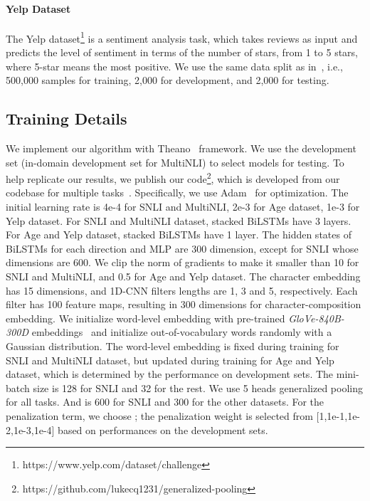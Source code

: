\documentclass[11pt]{article}
\begin{document}
\paragraph{Yelp Dataset} The Yelp dataset\footnote{https://www.yelp.com/dataset/challenge} is a sentiment analysis task, which takes reviews as input and predicts the level of sentiment in terms of the number of stars, from 1 to 5 stars, where 5-star means the most positive. We use the same data split as in~, i.e., 500,000 samples for training, 2,000 for development, and 2,000 for testing.

\subsection{Training Details} 
We implement our algorithm with Theano~\cite{2016arXiv160502688short} framework.
We use the development set (in-domain development set for MultiNLI) to select models for testing. To help replicate our results, we publish our code\footnote{https://github.com/lukecq1231/generalized-pooling}, which is developed from our codebase for multiple tasks~\cite{DBLP:conf/acl/ChenZLIW18,DBLP:conf/acl/ChenZLWJI17,DBLP:conf/ijcai/ChenZLWJ16,Zhang:qa:2017}. Specifically, we use Adam~\cite{DBLP:journals/corr/KingmaB14} for optimization. The initial learning rate is 4e-4 for SNLI and MultiNLI, 2e-3 for Age dataset, 1e-3 for Yelp dataset. For SNLI and MultiNLI dataset, stacked BiLSTMs have 3 layers. For Age and Yelp dataset, stacked BiLSTMs have 1 layer. The hidden states of BiLSTMs for each direction and MLP are 300 dimension, except for SNLI whose dimensions are 600. We clip the norm of gradients to make it smaller than 10 for SNLI and MultiNLI, and 0.5 for Age and Yelp dataset. The character embedding has 15 dimensions, and 1D-CNN filters lengths are 1, 3 and 5, respectively. Each filter has 100 feature maps, resulting in 300 dimensions for character-composition embedding. We initialize word-level embedding with pre-trained \textit{GloVe-840B-300D} embeddings~\cite{DBLP:conf/emnlp/PenningtonSM14} and initialize out-of-vocabulary words randomly with a Gaussian distribution. The word-level embedding is fixed during training for SNLI and MultiNLI dataset, but updated during training for Age and Yelp dataset, which is determined by the performance on development sets. 
The mini-batch size is 128 for SNLI and 32 for the rest. We use 5 heads generalized pooling for all tasks. And  is 600 for SNLI and 300 for the other datasets. For the penalization term, we choose ; the penalization weight  is selected from [1,1e-1,1e-2,1e-3,1e-4] based on performances on the development sets.
\end{document}

